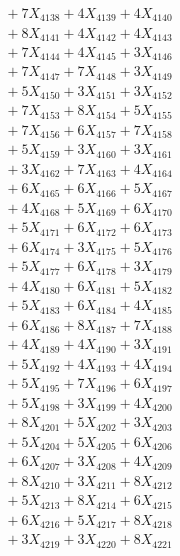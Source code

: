 \documentclass[a4paper,10pt]{article}
\begin{document}
{\begin{align}
&\;  + 7 X_{4138} + 4 X_{4139} + 4 X_{4140} \\[0.3ex]
&\;  + 8 X_{4141} + 4 X_{4142} + 4 X_{4143} \\[0.3ex]
&\;  + 7 X_{4144} + 4 X_{4145} + 3 X_{4146} \\[0.3ex]
&\;  + 7 X_{4147} + 7 X_{4148} + 3 X_{4149} \\[0.5ex]\allowbreak
&\;  + 5 X_{4150} + 3 X_{4151} + 3 X_{4152} \\[0.3ex]
&\;  + 7 X_{4153} + 8 X_{4154} + 5 X_{4155} \\[0.3ex]
&\;  + 7 X_{4156} + 6 X_{4157} + 7 X_{4158} \\[0.3ex]
&\;  + 5 X_{4159} + 3 X_{4160} + 3 X_{4161} \\[0.3ex]
&\;  + 3 X_{4162} + 7 X_{4163} + 4 X_{4164} \\[0.3ex]
&\;  + 6 X_{4165} + 6 X_{4166} + 5 X_{4167} \\[0.3ex]
&\;  + 4 X_{4168} + 5 X_{4169} + 6 X_{4170} \\[0.3ex]
&\;  + 5 X_{4171} + 6 X_{4172} + 6 X_{4173} \\[0.3ex]
&\;  + 6 X_{4174} + 3 X_{4175} + 5 X_{4176} \\[0.3ex]
&\;  + 5 X_{4177} + 6 X_{4178} + 3 X_{4179} \\[0.5ex]\allowbreak
&\;  + 4 X_{4180} + 6 X_{4181} + 5 X_{4182} \\[0.3ex]
&\;  + 5 X_{4183} + 6 X_{4184} + 4 X_{4185} \\[0.3ex]
&\;  + 6 X_{4186} + 8 X_{4187} + 7 X_{4188} \\[0.3ex]
&\;  + 4 X_{4189} + 4 X_{4190} + 3 X_{4191} \\[0.3ex]
&\;  + 5 X_{4192} + 4 X_{4193} + 4 X_{4194} \\[0.3ex]
&\;  + 5 X_{4195} + 7 X_{4196} + 6 X_{4197} \\[0.3ex]
&\;  + 5 X_{4198} + 3 X_{4199} + 4 X_{4200} \\[0.3ex]
&\;  + 8 X_{4201} + 5 X_{4202} + 3 X_{4203} \\[0.3ex]
&\;  + 5 X_{4204} + 5 X_{4205} + 6 X_{4206} \\[0.3ex]
&\;  + 6 X_{4207} + 3 X_{4208} + 4 X_{4209} \\[0.5ex]\allowbreak
&\;  + 8 X_{4210} + 3 X_{4211} + 8 X_{4212} \\[0.3ex]
&\;  + 5 X_{4213} + 8 X_{4214} + 6 X_{4215} \\[0.3ex]
&\;  + 6 X_{4216} + 5 X_{4217} + 8 X_{4218} \\[0.3ex]
&\;  + 3 X_{4219} + 3 X_{4220} + 8 X_{4221} \\[0.3ex]

\end{align}}
\end{document}
